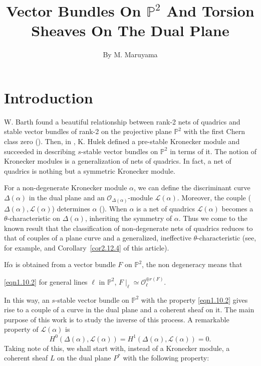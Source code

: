 \title{Vector Bundles On $\mathbb{P}^{2}$ And Torsion Sheaves On The
  Dual Plane}

\author{By M. Maruyama}

\date{}
\maketitle

\setcounter{page}{213}
\setcounter{pageoriginal}{274}
\section*{Introduction}\pageoriginale

W. Barth found a beautiful relationship between rank-2 nets of
quadrics and stable vector bundles of rank-2 on the projective plane
$\mathbb{P}^{2}$ with the first Chern class zero (\cite{key2}). Then,
in \cite{key7}, K. Hulek defined a pre-stable Kronecker module and
succeeded in describing $s$-stable vector bundles on $\mathbb{P}^{2}$ in
terms of it. The notion of Kronecker modules is a generalization of
nets of quadrics. In fact, a net of quadrics is nothing but a
symmetric Kronecker module.

For a non-degenerate Kronecker module $\alpha$, we can define the
discriminant curve $\Delta(\alpha)$ in the dual plane and an
$\mathscr{O}_{\Delta(\alpha)}$-module $\mathscr{L}(\alpha)$. Moreover,
the couple ($\Delta(\alpha),\mathscr{L}(\alpha)$) determines
$\alpha$ (\cite[p. 124, 125]{key7}). When $\alpha$ is a net of quadrics
$\mathscr{L}(\alpha)$ becomes a $\theta$-characteristic on
$\Delta(\alpha)$, inheriting the symmetry of $\alpha$. Thus we come to
the known result that the classification of non-degenerate nets of
quadrics reduces to that of couples of a plane curve and a
generalized, ineffective $\theta$-characteristic (see, for example,
\cite{key4} and Corollary~\ref{cor2.12.4} of this article).

If\pageoriginale $\alpha$ is obtained from a vector bundle $F$ on
$\mathbb{P}^{2}$, the non degeneracy means that 

\eqref{eqn1.10.2} for general lines $\ell$ in $\mathbb{P}^{2}$,
$F\mid_{\ell}\simeq\mathscr{O}^{\oplus r(F)}_{\ell}$.

\smallskip

In this way, an $s$-stable vector bundle on $\mathbb{P}^{2}$ with the
property \eqref{eqn1.10.2} gives rise to a couple of a curve in the
dual plane and a coherent sheaf on it. The main purpose of this work
is to study the inverse of this process. A remarkable property of
$\mathscr{L}(\alpha)$ is 
$$
H^{0}(\Delta(\alpha),\mathscr{L}(\alpha))=H^{1}(\Delta(\alpha), \mathscr{L}(\alpha))=0. 
$$
Taking note of this, we shall start with, instead of a Kronecker
module, a coherent sheaf $L$ on the dual plane $P^{\ast}$ with the
following property:

